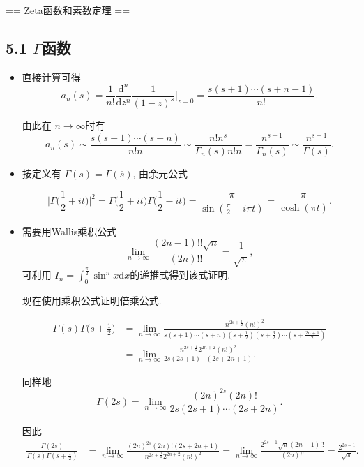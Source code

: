 == Zeta函数和素数定理 ==

 \subsection*{5.1 $\Gamma$函数}
 \begin{itemize}
    \item[5.1.1]

直接计算可得
$$a_n(s) = \frac{1}{n !}\frac{\mathrm{d}^n}{\mathrm{d}z^n} 
\frac{1}{(1-z)^s}\Big|_{z = 0} = \frac{s(s+1)\cdots(s+n-1)}{n!}.$$

由此在 $n\to \infty$时有
$$a_n(s) \sim \frac{s(s+1)\cdots(s+n)}{n!n}
\sim \frac{n! n^{s}}{\Gamma_{n}(s)n!n}  
=  \frac{n^{s-1}}{\Gamma_{n}(s)}\sim \frac{n^{s-1}}{\Gamma(s)}. $$

    \item[5.1.2]

按定义有 $\overline{\Gamma(s)} =\Gamma(\overline{s})$, 由余元公式

$$\Big|\Gamma\Big(\frac{1}{2}+it\Big)\Big|^2 
= \Gamma\Big(\frac{1}{2}+it\Big)\Gamma\Big(\frac{1}{2}-it\Big) 
= \frac{\pi}{\sin\left( \frac{\pi}{2}-i\pi t \right)} 
= \frac{\pi}{\cosh (\pi t)}.$$

    \item[5.1.3]

需要用Wallis乘积公式
$$\lim_{n \to \infty}\frac{(2n-1)!!\sqrt{n}}{(2n)!!} = \frac{1}{\sqrt{\pi}},$$
可利用 $I_n = \int_0^{\frac{\pi}{2}}\sin^n x \mathrm{d}x$的递推式得到该式证明.

现在使用乘积公式证明倍乘公式.

\begin{align*}
    \Gamma(s)\Gamma\Big( s+\frac{1}{2} \Big)
    & = \lim_{n \to \infty}\frac{n^{2s+\frac{1}{2}}(n!)^2}
    {s(s+1)\cdots(s+n)(s+\frac{1}{2})(s+\frac{3}{2})\cdots (s+\frac{2n+1}{2})}\\
    & = \lim_{n \to \infty}\frac{n^{2s+\frac{1}{2}}2^{2n+2}(n!)^2}
    {2s(2s+1)\cdots(2s+2n+1)}.
\end{align*}

同样地
$$\Gamma(2s) = \lim_{n \to \infty}\frac{(2n)^{2s}(2n)!}{2s(2s+1)\cdots(2s+2n)}.$$

因此
\begin{align*}
    \frac{\Gamma(2s)}{\Gamma(s)\Gamma\left( s+\frac{1}{2} \right)} 
    &= \lim_{n \to \infty} \frac{(2n)^{2s}(2n)! (2s+2n+1)}
    {n^{2s+\frac{1}{2}}2^{2n+2}(n!)^2} 
    =\lim_{n \to \infty} \frac{2^{2s-1} \sqrt{n}(2n-1)!!}{(2n)!!} 
    =  \frac{2^{2s-1}}{\sqrt{\pi}}.
\end{align*}



\end{itemize}
